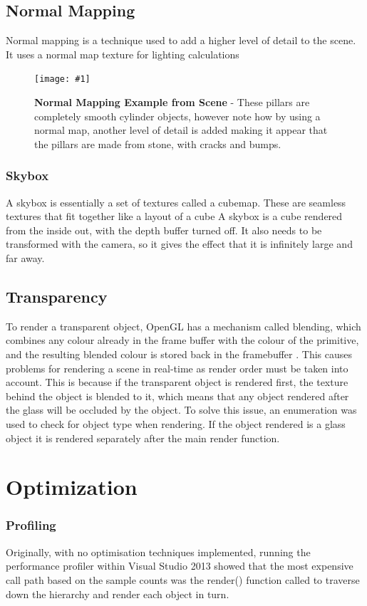 \documentclass[conference]{acmsiggraph}
\newcommand{\figuremacroW}[4]{
	\begin{figure}[h] %
		\centering
		\texttt{[image: \#1]}
		\caption[#2]{\textbf{#2} - #3}
		\label{fig:#1}
	\end{figure}
}
\begin{document}
\subsection{Normal Mapping}

Normal mapping is a technique used to add a higher level of detail to the scene. It uses a normal map texture for lighting calculations

\figuremacroW
{normalMap}
{Normal Mapping Example from Scene}
{These pillars are completely smooth cylinder objects, however note how by using a normal map, another level of detail is added making it appear that the pillars are made from stone, with cracks and bumps.}
{1.0}

\subsubsection{Skybox}
A skybox is essentially a set of textures called a cubemap. These are seamless textures that fit together like a layout of a cube
A skybox is a cube rendered from the inside out, with the depth buffer turned off. It also needs to be transformed with the camera, so it gives the effect that it is infinitely large and far away.

\subsection{Transparency}

To render a transparent object, OpenGL has a mechanism called blending, which combines any colour already in the frame buffer with the colour of the primitive, and the resulting blended colour is stored back in the framebuffer \cite{openGLBlend}. This causes problems for rendering a scene in real-time as render order must be taken into account. This is because if the transparent object is rendered first, the texture behind the object is blended to it, which means that any object rendered after the glass will be occluded by the object.
To solve this issue, an enumeration was used to check for object type when rendering. If the object rendered is a glass object it is rendered separately after the main render function.

\section{Optimization}

\subsubsection{Profiling}
Originally, with no optimisation techniques implemented, running the performance profiler within Visual Studio 2013 showed that the most expensive call path based on the sample counts was the render() function called to traverse down the hierarchy and render each object in turn.
\end{document}
